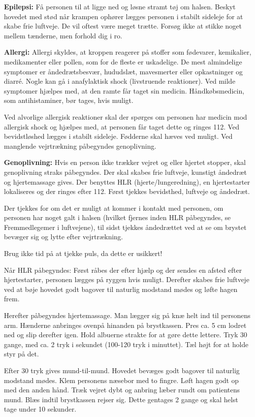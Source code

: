 \documentclass[../../../main.tex]{subfiles}
\begin{document}
\textbf{Epilepsi:} Få personen til at ligge ned og løsne stramt tøj om halsen.  Beskyt hovedet med stød når krampen ophører lægges personen i stabilt sideleje for at skabe frie luftveje. De vil oftest være meget trætte. Forsøg ikke at stikke noget mellem tænderne, men forhold dig i ro. 


\textbf{Allergi:} Allergi skyldes, at kroppen reagerer på stoffer som fødevarer, kemikalier, medikamenter eller pollen, som for de fleste er uskadelige. De mest almindelige symptomer er åndedrætsbesvær, hududslæt, mavesmerter eller opkastninger og diarré. Nogle kan gå i anafylaktisk shock (livstruende reaktioner). 
Ved milde symptomer hjælpes med, at den ramte får taget sin medicin. Håndkøbsmedicin, som antihistaminer, bør tages, hvis muligt.

Ved alvorlige allergisk reaktioner skal der spørges om personen har medicin mod allergisk shock og hjælpes med, at personen får taget dette og ringes 112. Ved bevidstløshed lægges i stabilt sideleje. Fødderne skal hæves ved muligt. Ved manglende vejrtrækning påbegyndes genoplivning.


\textbf{Genoplivning:} Hvis en person ikke trækker vejret og eller hjertet stopper, skal genoplivning straks påbegyndes. Der skal skabes frie luftveje, kunstigt åndedræt og hjertemassage gives. Der benyttes HLR (hjerte/lungeredning), en hjertestarter lokaliseres og der ringes efter 112.
Først tjekkes bevidsthed, luftveje og åndedræt.


Der tjekkes for om det er muligt at kommer i kontakt med personen, om personen har noget galt i halsen (hvilket fjernes inden HLR påbegyndes, se Fremmedlegemer i luftvejene), til sidst tjekkes åndedrættet ved at se om brystet bevæger sig og lytte efter vejrtrækning. 


Brug ikke tid på at tjekke puls, da dette er usikkert!


Når HLR påbegyndes: Først råbes der efter hjælp og der sendes en afsted efter hjertestarter, personen lægges på ryggen hvis muligt. Derefter skabes frie luftveje ved at bøje hovedet godt bagover til naturlig modstand mødes og løfte hagen frem.


Herefter påbegyndes hjertemassage. Man lægger sig på knæ helt ind til personens arm. Hænderne anbringes ovenpå hinanden på brystkassen. Pres ca. 5 cm lodret ned og slip derefter igen. Hold albuerne strakte for at gøre dette lettere. Tryk 30 gange, med ca. 2 tryk i sekundet (100-120 tryk i minuttet). Tæl højt for at holde styr på det.


Efter 30 tryk gives mund-til-mund. Hovedet bevæges godt bagover til naturlig modstand mødes. Klem personens næsebor med to fingre. Løft hagen godt op med den anden hånd. Træk vejret dybt og anbring læber rundt om patientens mund. Blæs indtil brystkassen rejser sig. Dette gentages 2 gange og skal helst tage under 10 sekunder.
\end{document}
